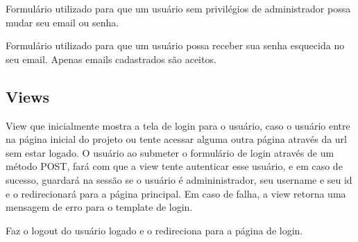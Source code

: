 \documentclass[letterpaper,10pt,brazil]{sphinxmanual}
\begin{document}
\begin{fulllineitems}
\label{apps/accounts:accounts.forms.OnlyUserForm}
Formulário utilizado para que um usuário sem privilégios de administrador possa mudar seu email ou senha.

\end{fulllineitems}


\begin{fulllineitems}
\label{apps/accounts:accounts.forms.PassResetForm}
Formulário utilizado para que um usuário possa receber sua senha esquecida no seu email. Apenas emails cadastrados são aceitos.

\end{fulllineitems}



\subsection{Views}
\label{apps/accounts:module-accounts.views}\label{apps/accounts:views}

\begin{fulllineitems}
\label{apps/accounts:accounts.views.login}
View que inicialmente mostra a tela de login para o usuário, caso o usuário entre na página inicial do projeto ou tente acessar alguma outra página através da url sem estar logado. O usuário ao submeter o formulário de login através de um método POST, fará com que a view tente autenticar esse usuário, e em caso de sucesso, guardará na sessão se o usuário é admininistrador, seu username e seu id e o redirecionará para a página principal. Em caso de falha, a view retorna uma mensagem de erro para o template de login.

\end{fulllineitems}


\begin{fulllineitems}
\label{apps/accounts:accounts.views.logout}
Faz o logout do usuário logado e o redireciona para a página de login.

\end{fulllineitems}
\end{document}
